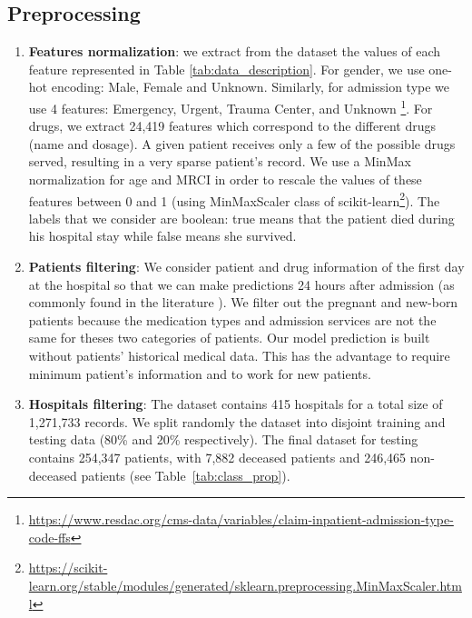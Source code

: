 \documentclass[accepted]{uai2021} %
\begin{document}
\subsection{Preprocessing} 

\label{preprocessing}

\begin{enumerate}
    \item \textbf{Features normalization}: we extract from the dataset the values of each feature represented in Table \ref{tab:data_description}. For gender, we use one-hot encoding: Male, Female and Unknown. Similarly, for admission type we use 4 features: Emergency, Urgent, Trauma Center, and Unknown \footnote{\url{https://www.resdac.org/cms-data/variables/claim-inpatient-admission-type-code-ffs}}. For drugs, we extract 24,419 features which correspond to the different drugs (name and dosage). A given patient receives only a few of the possible drugs served, resulting in a very sparse patient's record. We use a MinMax normalization for age and MRCI in order to rescale the values of these features between 0 and 1 (using MinMaxScaler class of scikit-learn\footnote{\url{https://scikit-learn.org/stable/modules/generated/sklearn.preprocessing.MinMaxScaler.html}}). The labels that we consider are boolean: true means that the patient died during his hospital stay while false means she survived. 

    
    \item \textbf{Patients filtering}: We consider patient and drug information of the first day at the hospital so that we can make predictions 24 hours after admission (as commonly found in the literature \citep{rajkomar-npj18,Papier_Amela}). We filter out the pregnant and new-born patients because the medication types and admission services are not the same for theses two categories of patients. Our model prediction is built without patients' historical medical data. This has the advantage to require minimum patient's information and to work for new patients.
    
    \item \textbf{Hospitals filtering}: The dataset contains 415 hospitals for a total size of 1,271,733 records. We split randomly the dataset into disjoint training and testing data (80\% and 20\% respectively).  The final dataset for testing contains 254,347 patients, with 7,882 deceased patients and 246,465 non-deceased patients (see Table~\ref{tab:class_prop}).
    

\end{enumerate}
\end{document}
